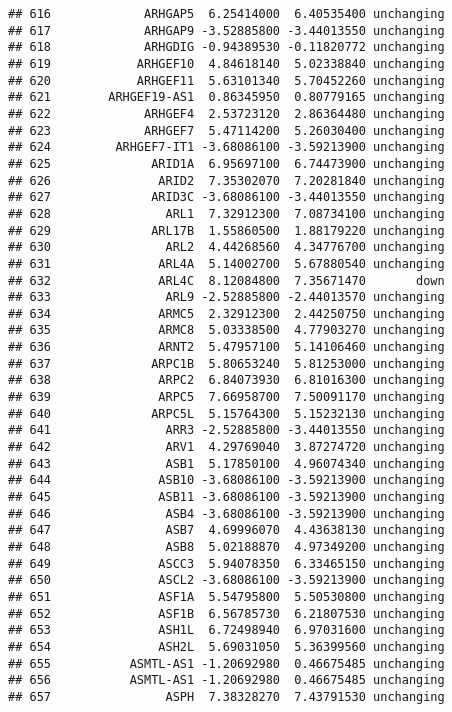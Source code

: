 \documentclass[]{article}
\begin{document}
\begin{verbatim}
## 616             ARHGAP5  6.25414000  6.40535400 unchanging
## 617             ARHGAP9 -3.52885800 -3.44013550 unchanging
## 618             ARHGDIG -0.94389530 -0.11820772 unchanging
## 619            ARHGEF10  4.84618140  5.02338840 unchanging
## 620            ARHGEF11  5.63101340  5.70452260 unchanging
## 621        ARHGEF19-AS1  0.86345950  0.80779165 unchanging
## 622             ARHGEF4  2.53723120  2.86364480 unchanging
## 623             ARHGEF7  5.47114200  5.26030400 unchanging
## 624         ARHGEF7-IT1 -3.68086100 -3.59213900 unchanging
## 625              ARID1A  6.95697100  6.74473900 unchanging
## 626               ARID2  7.35302070  7.20281840 unchanging
## 627              ARID3C -3.68086100 -3.44013550 unchanging
## 628                ARL1  7.32912300  7.08734100 unchanging
## 629              ARL17B  1.55860500  1.88179220 unchanging
## 630                ARL2  4.44268560  4.34776700 unchanging
## 631               ARL4A  5.14002700  5.67880540 unchanging
## 632               ARL4C  8.12084800  7.35671470       down
## 633                ARL9 -2.52885800 -2.44013570 unchanging
## 634               ARMC5  2.32912300  2.44250750 unchanging
## 635               ARMC8  5.03338500  4.77903270 unchanging
## 636               ARNT2  5.47957100  5.14106460 unchanging
## 637              ARPC1B  5.80653240  5.81253000 unchanging
## 638               ARPC2  6.84073930  6.81016300 unchanging
## 639               ARPC5  7.66958700  7.50091170 unchanging
## 640              ARPC5L  5.15764300  5.15232130 unchanging
## 641                ARR3 -2.52885800 -3.44013550 unchanging
## 642                ARV1  4.29769040  3.87274720 unchanging
## 643                ASB1  5.17850100  4.96074340 unchanging
## 644               ASB10 -3.68086100 -3.59213900 unchanging
## 645               ASB11 -3.68086100 -3.59213900 unchanging
## 646                ASB4 -3.68086100 -3.59213900 unchanging
## 647                ASB7  4.69996070  4.43638130 unchanging
## 648                ASB8  5.02188870  4.97349200 unchanging
## 649               ASCC3  5.94078350  6.33465150 unchanging
## 650               ASCL2 -3.68086100 -3.59213900 unchanging
## 651               ASF1A  5.54795800  5.50530800 unchanging
## 652               ASF1B  6.56785730  6.21807530 unchanging
## 653               ASH1L  6.72498940  6.97031600 unchanging
## 654               ASH2L  5.69031050  5.36399560 unchanging
## 655           ASMTL-AS1 -1.20692980  0.46675485 unchanging
## 656           ASMTL-AS1 -1.20692980  0.46675485 unchanging
## 657                ASPH  7.38328270  7.43791530 unchanging

\end{verbatim}
\end{document}
